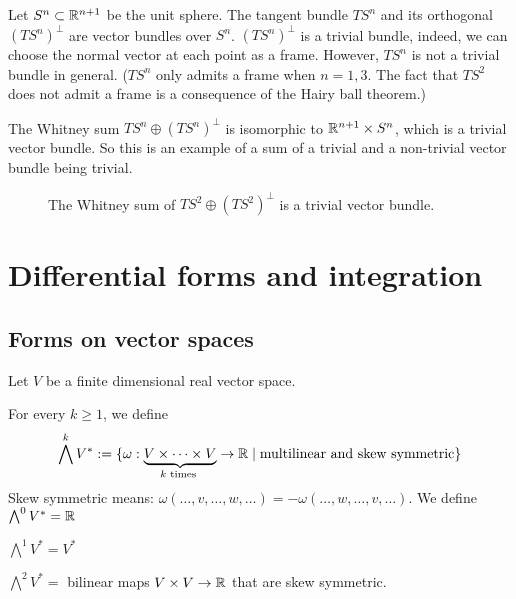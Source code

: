 \begin{eg}
    Let $S^{n} \subset \mathbb{R}^{n+1}$ be the unit sphere.
    The tangent bundle $TS^{n}$ and its orthogonal $(TS^{n})^{\perp}$ are vector bundles over $S^{n}$.
    $(TS^{n})^{\perp}$ is a trivial bundle, indeed, we can choose the normal vector at each point as a frame.
    However, $TS^{n}$ is not a trivial bundle in general.
    ($TS^{n}$ only admits a frame when $n = 1, 3$. The fact that $TS^2$ does not admit a frame is a consequence of the Hairy ball theorem.)

    The Whitney sum $ TS^{n}\oplus (TS^{n})^{\perp}$   is isomorphic to $\mathbb{R}^{n+1} \times S^{n}$, which is a trivial vector bundle.
    So this is an example of a sum of a trivial and a non-trivial vector bundle being trivial.
    \end{eg}
\begin{figure}[H]
    \centering
    \caption{The Whitney sum of $TS^{2}\oplus (TS^{2})^{\perp}$ is a trivial vector bundle.}
    \label{fig:example-of-a-vector-bundle-that-doesnt-admit-a-frame}
\end{figure}


\setcounter{chapter}{4}
\chapter{Differential forms and integration}

\section{Forms on vector spaces}

Let $V$ be a finite dimensional real vector space.

\begin{definition}
    For every $k\ge 1$, we define \[
        \bigwedge^{k} V^{*} := \{\omega: \underbrace{V \times \cdots \times  V}_{\text{$k$ times }}  \to \mathbb{R} \mid  \text{multilinear and skew symmetric}\} 
\]
Skew symmetric means: $\omega(\ldots, v, \ldots, w,\ldots) =-\omega(\ldots, w, \ldots, v,\ldots)$.
We define $\bigwedge^{0} V^{*} = \mathbb{R}$
\end{definition}
\begin{eg}
    $\bigwedge ^{1} V^{*} = V^{*}$
\end{eg}
\begin{eg}
    $\bigwedge^2 V^{*} = $ bilinear maps $V\times V \to \mathbb{R}$ that are skew symmetric.
\end{eg}

